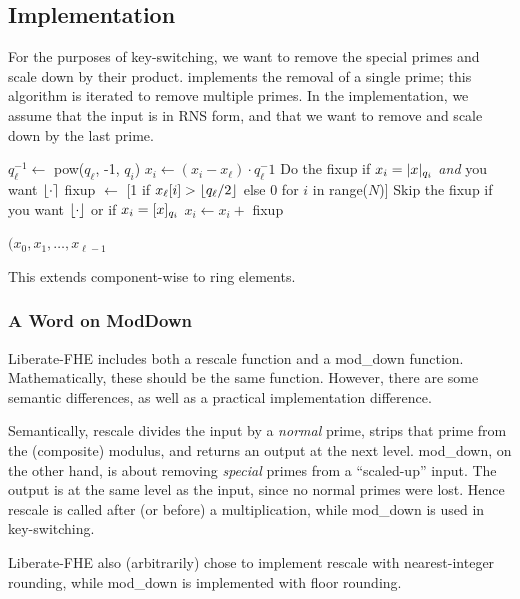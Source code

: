 \documentclass[../../fheimpl.tex]{subfiles}
\begin{document}
\subsection{Implementation}
For the purposes of key-switching, we want to remove the special primes and scale down by their product.  implements the removal of a single prime; this algorithm is iterated to remove multiple primes. In the implementation, we assume that the input is in RNS form, and that we want to remove and scale down by the last prime.

\begin{algorithm}
	\caption{Rescale}\label{alg:rescale}
	\begin{algorithmic}[1]
		\State $q_\ell^{-1} \gets $ pow($q_\ell$, -1, $q_i$)
		\State $x_i \gets (x_i - x_\ell)\cdot q_\ell^-1$
		\EndFor
		\State \Comment Do the fixup if $x_i=\lvert x\rvert_{q_i}$ \emph{and} you want $\lfloor\cdot\rceil$
		\State fixup $\gets$ [1 if $x_\ell[i]>\lfloor q_\ell/2\rfloor$ else 0 for $i$ in range($N$)]
		\Comment Skip the fixup if you want $\lfloor\cdot\rfloor$ or if $x_i=[x]_{q_i}$
		\State $x_i \gets x_i +$ fixup
		\EndFor
		
		\State \Return $(x_0, x_1, \ldots, x_{\ell-1}$
		\EndProcedure
	\end{algorithmic}
\end{algorithm}

This extends component-wise to ring elements.

\subsubsection{A Word on ModDown}
Liberate-FHE includes both a \textrm{rescale} function and a \textrm{mod\_down} function. Mathematically, these should be the same function. However, there are some semantic differences, as well as a practical implementation difference. 

Semantically, \textrm{rescale} divides the input by a \emph{normal} prime, strips that prime from the (composite) modulus, and returns an output at the next level. \textrm{mod\_down}, on the other hand, is about removing \emph{special} primes from a ``scaled-up'' input. The output is at the same level as the input, since no normal primes were lost. Hence \textrm{rescale} is called after (or before) a multiplication, while \textrm{mod\_down} is used in key-switching.

Liberate-FHE also (arbitrarily) chose to implement \textrm{rescale} with nearest-integer rounding, while \textrm{mod\_down} is implemented with \textrm{floor} rounding.

\ifcompileasbook
\else
\printbibliography
\fi
\end{document}
